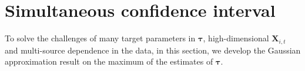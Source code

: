 \documentclass[12pt]{article}
\def\be{\begin{equation}}
\def\ee{\end{equation}}
\theoremstyle{definition}
\newcommand{\bW}{{\mathbf W}}
\newcommand{\bX}{{\mathbf X}}
\newcommand{\bY}{{\mathbf Y}}
\newcommand{\btau}{\boldsymbol{\tau}}
\begin{document}

\setcounter{equation}{0}
\section{Simultaneous confidence interval}\label{se:method}

To solve the challenges of many target parameters in $\btau$, high-dimensional $\bX_{i, t}$ and multi-source dependence in the data,
in this section, we develop the Gaussian approximation result on the maximum of the estimates of $\btau$.
\end{document}

